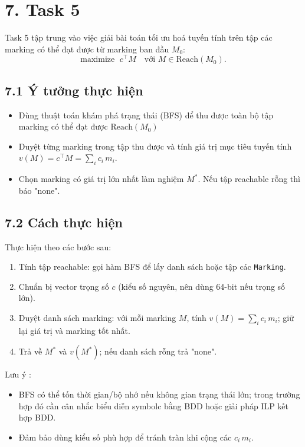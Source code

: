 \documentclass[12pt,a4paper]{article}
\begin{document}
\section*{7. Task 5}
Task 5 tập trung vào việc giải bài toán tối ưu hoá tuyến tính trên tập các marking có thể đạt được từ marking ban đầu $M_0$:
\begin{equation*}
	\text{maximize }\; c^{\top}M \quad\text{với } M\in\mathrm{Reach}(M_0).
\end{equation*}

\subsection*{7.1 Ý tưởng thực hiện}

\begin{itemize}
    \item Dùng thuật toán khám phá trạng thái (BFS) để thu được toàn bộ tập marking có thể đạt được $\mathrm{Reach}(M_0)$ 
    \item Duyệt từng marking trong tập thu được và tính giá trị mục tiêu tuyến tính $v(M)=c^{\top}M = \sum_i c_i\,m_i$.
    \item Chọn marking có giá trị lớn nhất làm nghiệm $M^*$. Nếu tập reachable rỗng thì báo "none".
\end{itemize}

\subsection*{7.2 Cách thực hiện }
Thực hiện theo các bước sau:
\begin{enumerate}
    \item Tính tập reachable: gọi hàm BFS để lấy danh sách hoặc tập các \texttt{Marking}.
    \item Chuẩn bị vector trọng số $c$ (kiểu số nguyên, nên dùng 64-bit nếu trọng số lớn).
    \item Duyệt danh sách marking: với mỗi marking $M$, tính $v(M)=\sum_i c_i\,m_i$; giữ lại giá trị và marking tốt nhất.
    \item Trả về $M^*$ và $v(M^*)$; nếu danh sách rỗng trả "none".
\end{enumerate}

Lưu ý :
\begin{itemize}
    \item BFS có thể tốn thời gian/bộ nhớ nếu không gian trạng thái lớn; trong trường hợp đó cần cân nhắc biểu diễn symbolc bằng BDD hoặc giải pháp ILP kết hợp BDD.
    \item Đảm bảo dùng kiểu số phù hợp để tránh tràn khi cộng các $c_i\,m_i$.
\end{itemize}
\end{document}
